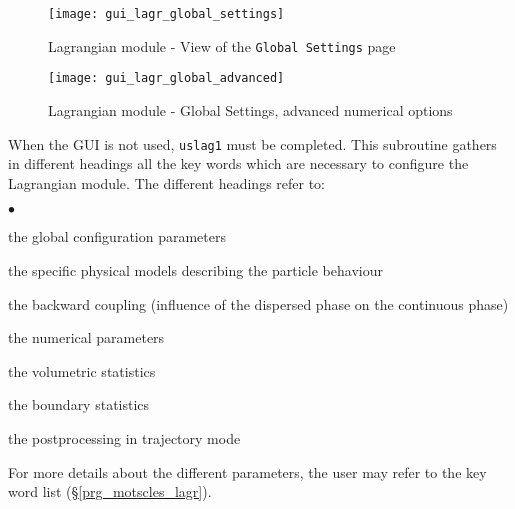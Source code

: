{{{\begin{figure}[ht]
\begin{center}
\texttt{[image: gui\_lagr\_global\_settings]}
\caption{Lagrangian module - View of the \texttt{Global Settings} page}
\label{fig:Ini-Lag1}
\end{center}
\end{figure}
% 
% 
 \begin{figure}[ht]
 \begin{center}
 \texttt{[image: gui\_lagr\_global\_advanced]}
 \caption{Lagrangian module - Global Settings, advanced numerical options}
 \label{fig:Ini-Lag3}
 \end{center}
 \end{figure}
% 
% 


\noindent
When the GUI is not used, \texttt{uslag1} must be completed. This subroutine gathers in different headings all the key words which are
necessary to configure the Lagrangian module. The different headings refer to:
\begin{list}{$\bullet$}{}
\item the global configuration parameters
\item the specific physical models describing the particle behaviour
\item the backward coupling (influence of the dispersed phase on the
      continuous phase)
\item the numerical parameters
\item the volumetric statistics
\item the boundary statistics
\item the postprocessing in trajectory mode
\end{list}
%
\noindent
For more details about the different parameters, the user may refer to the
key word list (\S\ref{prg_motscles_lagr}).




}}}
